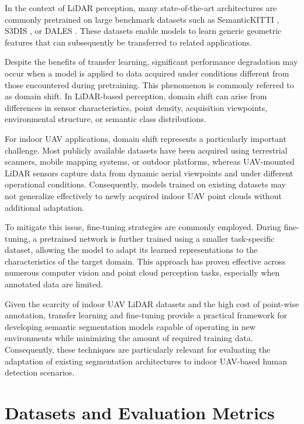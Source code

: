 In the context of LiDAR perception, many state-of-the-art architectures are commonly pretrained on large benchmark datasets such as SemanticKITTI \cite{Behley2019SemanticKITTI}, S3DIS \cite{Armeni2016S3DIS}, or DALES \cite{Varney2020DALES}. These datasets enable models to learn generic geometric features that can subsequently be transferred to related applications.

Despite the benefits of transfer learning, significant performance degradation may occur when a model is applied to data acquired under conditions different from those encountered during pretraining. This phenomenon is commonly referred to as domain shift.\cite{jaritz2020xmuda} In LiDAR-based perception, domain shift can arise from differences in sensor characteristics, point density, acquisition viewpoints, environmental structure, or semantic class distributions.

For indoor UAV applications, domain shift represents a particularly important challenge. Most publicly available datasets have been acquired using terrestrial scanners, mobile mapping systems, or outdoor platforms, whereas UAV-mounted LiDAR sensors capture data from dynamic aerial viewpoints and under different operational conditions. Consequently, models trained on existing datasets may not generalize effectively to newly acquired indoor UAV point clouds without additional adaptation.

To mitigate this issue, fine-tuning strategies are commonly employed. During fine-tuning, a pretrained network is further trained using a smaller task-specific dataset, allowing the model to adapt its learned representations to the characteristics of the target domain. This approach has proven effective across numerous computer vision and point cloud perception tasks, especially when annotated data are limited.

Given the scarcity of indoor UAV LiDAR datasets and the high cost of point-wise annotation, transfer learning and fine-tuning provide a practical framework for developing semantic segmentation models capable of operating in new environments while minimizing the amount of required training data. Consequently, these techniques are particularly relevant for evaluating the adaptation of existing segmentation architectures to indoor UAV-based human detection scenarios.

\section{Datasets and Evaluation Metrics}
\label{sec:datasets_metrics}

